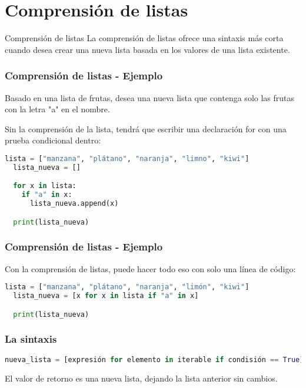 \section{Comprensión de listas}

\begin{frame}[c]{Comprensión de listas}
  La comprensión de listas ofrece una sintaxis más corta cuando
  desea crear una nueva lista basada en los valores de una lista
  existente.
\end{frame}

\begin{frame}[fragile]
  \frametitle{Comprensión de listas - Ejemplo}

  Basado en una lista de frutas, desea una nueva lista que
  contenga solo las frutas con la letra "a" en el nombre.

  \vspace{\baselineskip}
  Sin la comprensión de la lista, tendrá que escribir una declaración
  \textcolor{codeKeyword}{for} con una prueba condicional dentro: 

  \vspace{\baselineskip}
  \begin{lstlisting}[language=Python]
  lista = ["manzana", "plátano", "naranja", "limno", "kiwi"]
  lista_nueva = []

  for x in lista:
    if "a" in x:
      lista_nueva.append(x)

  print(lista_nueva)
  \end{lstlisting}
\end{frame}

\begin{frame}[fragile]
  \frametitle{Comprensión de listas - Ejemplo}

  Con la comprensión de listas, puede hacer todo eso con
  solo una línea de código:

  \vspace{\baselineskip}
  \begin{lstlisting}[language=Python]
  lista = ["manzana", "plátano", "naranja", "limón", "kiwi"]
  lista_nueva = [x for x in lista if "a" in x]

  print(lista_nueva)
  \end{lstlisting}
\end{frame}

\begin{frame}[fragile]
  \frametitle{La sintaxis}

  \begin{lstlisting}[language=Python]
nueva_lista = [expresión for elemento in iterable if condisión == True]
  \end{lstlisting}

  El valor de retorno es una nueva lista, dejando la lista anterior sin cambios.
\end{frame}

